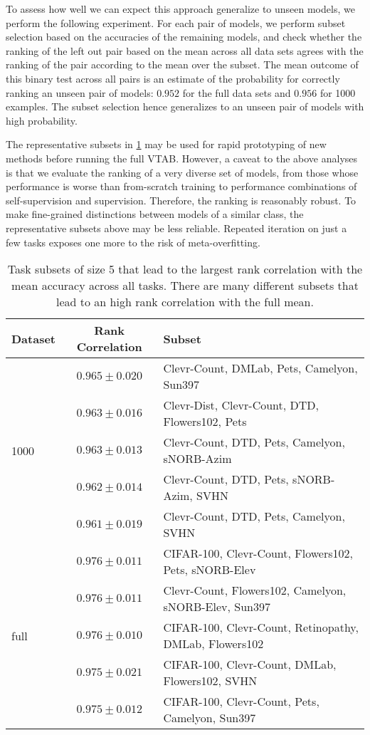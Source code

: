 \documentclass{article}
\begin{document}
To assess how well we can expect this approach generalize to unseen models, we perform the following experiment. For each pair of models, we perform subset selection based on the accuracies of the remaining models, and check whether the ranking of the left out pair based on the mean across all data sets agrees with the ranking of the pair according to the mean over the subset. The mean outcome of this binary test across all pairs is an estimate of the probability for correctly ranking an unseen pair of models: $0.952$ for the full data sets and $0.956$ for 1000 examples. The subset selection hence generalizes to an unseen pair of models with high probability.

The representative subsets in \cref{tab:subsetrank} may be used for rapid prototyping of new methods before running the full VTAB.
However, a caveat to the above analyses is that we evaluate the ranking of a very diverse set of models, from those whose performance is worse than from-scratch training to performance combinations of self-supervision and supervision.
Therefore, the ranking is reasonably robust.
To make fine-grained distinctions between models of a similar class, the representative subsets above may be less reliable.
Repeated iteration on just a few tasks exposes one more to the risk of meta-overfitting.

\begin{table}[h]
\begin{center}
\begin{tabular}{lcl}
\toprule
\bf Dataset & \bf Rank Correlation & \bf Subset \\
\toprule
\multirow{5}{*}{1000}
 & $0.965\pm0.020$ & Clevr-Count, DMLab, Pets, Camelyon, Sun397 \\
 & $0.963\pm0.016$ & Clevr-Dist, Clevr-Count, DTD, Flowers102, Pets \\
 & $0.963\pm0.013$ & Clevr-Count, DTD, Pets, Camelyon, sNORB-Azim \\
 & $0.962\pm0.014$ & Clevr-Count, DTD, Pets, sNORB-Azim, SVHN \\
 & $0.961\pm0.019$ & Clevr-Count, DTD, Pets, Camelyon, SVHN \\
\midrule
\multirow{5}{*}{full}
 & $0.976\pm0.011$ & CIFAR-100, Clevr-Count, Flowers102, Pets, sNORB-Elev \\
 & $0.976\pm0.011$ & Clevr-Count, Flowers102, Camelyon, sNORB-Elev, Sun397 \\
 & $0.976\pm0.010$ & CIFAR-100, Clevr-Count, Retinopathy, DMLab, Flowers102 \\
 & $0.975\pm0.021$ & CIFAR-100, Clevr-Count, DMLab, Flowers102, SVHN \\
 & $0.975\pm0.012$ & CIFAR-100, Clevr-Count, Pets, Camelyon, Sun397 \\
\bottomrule
\end{tabular}
 \caption{\label{tab:subsetrank} Task subsets of size 5 that lead to the largest rank correlation with the mean accuracy across all tasks. There are many different subsets that lead to an high rank correlation with the full mean.}
\end{center}
\end{table}
\end{document}
